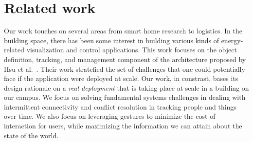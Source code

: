 \section{Related work}

Our work touches on several areas from smart home research to logistics.  In the building space, there has been
some interest in building various kinds of energy-related visualization and control applications.
This work focuses on the object definition, tracking, and management component of the architecture proposed by 
Hsu et al.~\cite{hbci}.  Their work stratefied the set of challenges that one could potentially face if the application 
were deployed at scale.  Our
work, in constrast, bases its design rationale on a \emph{real deployment} that is taking place at scale in a building 
on our campus.  We focus on solving fundamental systems challenges in dealing with intermittent connectivity
and conflict resolution in tracking people and things over time.  We also focus on leveraging gestures to minimize
the cost of interaction for users, while maximizing the information we can attain about the state of the world.

